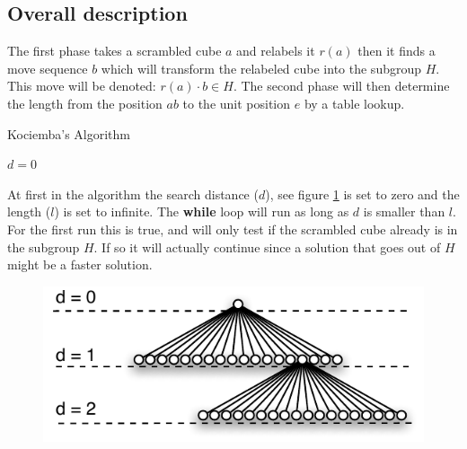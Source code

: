 \subsection{Overall description}
\label{sub:overallDescription}
The first phase takes a scrambled cube $a$ and relabels it $r(a)$ then it finds a move sequence $b$ which will transform the relabeled cube into the subgroup $H$. This move will be denoted: $r(a)\cdot{}b \in H$. The second phase will then determine the length from the position $ab$ to the unit position $e$ by a table lookup. 


\begin{algorithm}[!h]                     
\caption{Kociemba's Algorithm \cite{rokicki09}}          
\label{alg:kociemba}        
\begin{algorithmic}[1]
\STATE $d=0$
			\ENDIF
		\ENDIF
	\ENDFOR
\ENDWHILE
\end{algorithmic}
\end{algorithm}

At first in the algorithm the search distance ($d$), see figure \ref{fig:searchExpansion} is set to zero and the length ($l$) is set to infinite. The \textbf{while} loop will run as long as $d$ is smaller than $l$. For the first run this is true, and will only test if the scrambled cube already is in the subgroup $H$. If so it will actually continue since a solution that goes out of $H$ might be a faster solution.  \cite{cubemail92} 
\begin{figure}[!hb]
	\centering
		\includegraphics[scale=0.75]{input/pics/searchExpansion.pdf}
	\caption{}
	\label{fig:searchExpansion}
\end{figure}

